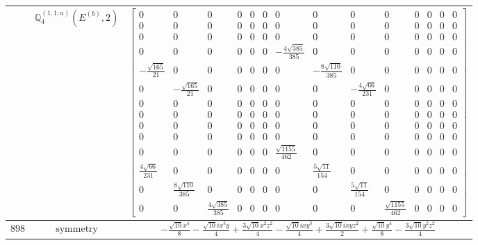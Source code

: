\documentclass[fleqn,8pt,landscape]{jsarticle}
\begin{document}
\begin{longtable}{ccc}
$  $ & $ \mathbb{Q}_{4}^{(1,1;a)}(E^{(b)},2) $ & $ \begin{bmatrix} 0 & 0 & 0 & 0 & 0 & 0 & 0 & 0 & 0 & 0 & 0 & 0 & 0 & 0 \\ 0 & 0 & 0 & 0 & 0 & 0 & 0 & 0 & 0 & 0 & 0 & 0 & 0 & 0 \\ 0 & 0 & 0 & 0 & 0 & 0 & 0 & 0 & 0 & 0 & 0 & 0 & 0 & 0 \\ 0 & 0 & 0 & 0 & 0 & 0 & - \frac{4 \sqrt{385}}{385} & 0 & 0 & 0 & 0 & 0 & 0 & 0 \\ - \frac{\sqrt{165}}{21} & 0 & 0 & 0 & 0 & 0 & 0 & - \frac{8 \sqrt{110}}{385} & 0 & 0 & 0 & 0 & 0 & 0 \\ 0 & - \frac{\sqrt{165}}{21} & 0 & 0 & 0 & 0 & 0 & 0 & - \frac{4 \sqrt{66}}{231} & 0 & 0 & 0 & 0 & 0 \\ 0 & 0 & 0 & 0 & 0 & 0 & 0 & 0 & 0 & 0 & 0 & 0 & 0 & 0 \\ 0 & 0 & 0 & 0 & 0 & 0 & 0 & 0 & 0 & 0 & 0 & 0 & 0 & 0 \\ 0 & 0 & 0 & 0 & 0 & 0 & 0 & 0 & 0 & 0 & 0 & 0 & 0 & 0 \\ 0 & 0 & 0 & 0 & 0 & 0 & 0 & 0 & 0 & 0 & 0 & 0 & 0 & 0 \\ 0 & 0 & 0 & 0 & 0 & 0 & \frac{\sqrt{1155}}{462} & 0 & 0 & 0 & 0 & 0 & 0 & 0 \\ \frac{4 \sqrt{66}}{231} & 0 & 0 & 0 & 0 & 0 & 0 & \frac{5 \sqrt{11}}{154} & 0 & 0 & 0 & 0 & 0 & 0 \\ 0 & \frac{8 \sqrt{110}}{385} & 0 & 0 & 0 & 0 & 0 & 0 & \frac{5 \sqrt{11}}{154} & 0 & 0 & 0 & 0 & 0 \\ 0 & 0 & \frac{4 \sqrt{385}}{385} & 0 & 0 & 0 & 0 & 0 & 0 & \frac{\sqrt{1155}}{462} & 0 & 0 & 0 & 0 \end{bmatrix} $ \\ \hline
$ 898 $ & $ \text{symmetry} $ & $ - \frac{\sqrt{10} x^{4}}{8} - \frac{\sqrt{10} i x^{3} y}{4} + \frac{3 \sqrt{10} x^{2} z^{2}}{4} - \frac{\sqrt{10} i x y^{3}}{4} + \frac{3 \sqrt{10} i x y z^{2}}{2} + \frac{\sqrt{10} y^{4}}{8} - \frac{3 \sqrt{10} y^{2} z^{2}}{4} $ \\

\end{longtable}
\end{document}
